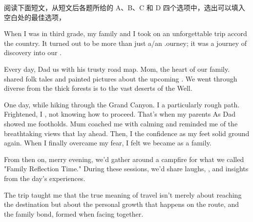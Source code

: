 \documentclass{英语试卷}
\begin{document}
\par 阅读下面短文，从短文后各题所给的 A、B、C 和 D 四个选项中，选出可以填入空白处的最佳选项，\par
\par When I was in third grade, my family and I took on an unforgettable trip accord the country. It turned out to be more than just a/an  .ourney; it was a journey of discovery into our .\par
\par Every day, Dad  us with his trusty road map. Mom, the heart of our family. shared folk tales and painted pictures about the upcoming . We went through diverse  from the thick forests is to the vast deserts of the Well.\par
\par One day, while hiking through the Grand Canyon. I  a particularly rough path. Frightened, I , not knowing how to proceed. That's when my parents  As Dad showed me footholds. Mum coached me with calming  and reminded me of the breathtaking views that lay ahead. Then, I  the confidence as my feet  solid ground again. When I finally overcame my fear, I felt we became  as a family.\par
\par From then on, merry evening, we'd gather around a campfire for what we  called "Family Reflection Time." During these sessions, we'd share laughs, , and insights from the day's experiences.\par
\par The trip taught me that the true meaning of travel isn't merely about reaching the destination but about the personal growth that happens on the route, and the family bond, formed when facing  together.\par
{}
\end{document}
